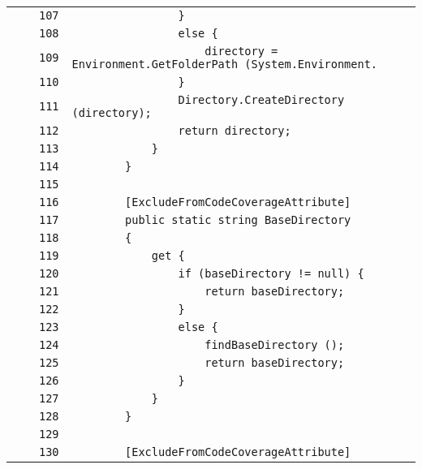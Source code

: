 \documentclass[a4paper,10pt]{article}
\begin{document}
\begin{longtable}[l]{lrrl}
\cellcolor{gray} &  & \verb~107~ & \verb~                }~\\
\cellcolor{gray} &  & \verb~108~ & \verb~                else {~\\
\cellcolor{gray} &  & \verb~109~ & \verb~                    directory = Environment.GetFolderPath (System.Environment.~\\
\cellcolor{gray} &  & \verb~110~ & \verb~                }~\\
\cellcolor{gray} &  & \verb~111~ & \verb~                Directory.CreateDirectory (directory);~\\
\cellcolor{gray} &  & \verb~112~ & \verb~                return directory;~\\
\cellcolor{gray} &  & \verb~113~ & \verb~            }~\\
\cellcolor{gray} &  & \verb~114~ & \verb~        }~\\
\cellcolor{gray} &  & \verb~115~ & \verb~~\\
\cellcolor{gray} &  & \verb~116~ & \verb~        [ExcludeFromCodeCoverageAttribute]~\\
\cellcolor{gray} &  & \verb~117~ & \verb~        public static string BaseDirectory~\\
\cellcolor{gray} &  & \verb~118~ & \verb~        {~\\
\cellcolor{gray} &  & \verb~119~ & \verb~            get {~\\
\cellcolor{gray} &  & \verb~120~ & \verb~                if (baseDirectory != null) {~\\
\cellcolor{gray} &  & \verb~121~ & \verb~                    return baseDirectory;~\\
\cellcolor{gray} &  & \verb~122~ & \verb~                }~\\
\cellcolor{gray} &  & \verb~123~ & \verb~                else {~\\
\cellcolor{gray} &  & \verb~124~ & \verb~                    findBaseDirectory ();~\\
\cellcolor{gray} &  & \verb~125~ & \verb~                    return baseDirectory;~\\
\cellcolor{gray} &  & \verb~126~ & \verb~                }~\\
\cellcolor{gray} &  & \verb~127~ & \verb~            }~\\
\cellcolor{gray} &  & \verb~128~ & \verb~        }~\\
\cellcolor{gray} &  & \verb~129~ & \verb~~\\
\cellcolor{gray} &  & \verb~130~ & \verb~        [ExcludeFromCodeCoverageAttribute]~\\

\end{longtable}
\end{document}
